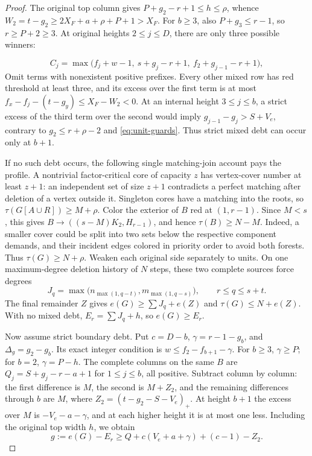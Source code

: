 \documentclass[11pt,a4paper]{article}
\theoremstyle{definition}
\begin{document}
\begin{proof}
The original top column gives $P+g_2-r+1\le h\le\rho$, whence
$W_2=t-g_2\ge2X_F+a+\rho+P+1>X_F$.
For $b\ge3$, also $P+g_3\le r-1$, so $r\ge P+2\ge3$.
At original heights $2\le j\le D$, there are only three possible winners:

\begin{equation}\label{eq:owncap-columns}
 C_j=\max\bigl(f_j+w-1,\ s+g_j-r+1,\ f_2+g_{j-1}-r+1\bigr),
\end{equation}
Omit terms with nonexistent positive prefixes. Every other mixed row has red threshold at least three, and its excess over the first term is at most
$f_x-f_j-(t-g_y)\le X_F-W_2<0$.
At an internal height $3\le j\le b$, a strict excess of the third term over the second would imply
$g_{j-1}-g_j>S+V_e$, contrary to $g_2\le r+\rho-2$ and \eqref{eq:unit-guards}.
Thus strict mixed debt can occur only at $b+1$.

If no such debt occurs, the following single matching-join account pays the profile.
A nontrivial factor-critical core of capacity $z$ has vertex-cover number at least $z+1$: an independent set of size $z+1$ contradicts a perfect matching after deletion of a vertex outside it.
Singleton cores have a matching into the roots, so $\tau(G[A\cup R])\ge M+\rho$.
Color the exterior of $B$ red at $(1,r-1)$. Since $M<s$, this gives
$B\to((s-M)K_2,H_{r-1})$, and hence $\tau(B)\ge N-M$.
Indeed, a smaller cover could be split into two sets below the respective component demands, and their incident edges colored in priority order to avoid both forests.
Thus $\tau(G)\ge N+\rho$.
Weaken each original side separately to units. On one maximum-degree deletion history of $N$ steps, these two complete sources force degrees
\[
 J_q=\max\bigl(n_{\max(1,q-t)},m_{\max(1,q-s)}\bigr),
 \qquad r\le q\le s+t.
\]
The final remainder $Z$ gives $e(G)\ge\sum J_q+e(Z)$ and $\tau(G)\le N+e(Z)$.
With no mixed debt, $E_r=\sum J_q+h$, so $e(G)\ge E_r$.

Now assume strict boundary debt. Put
$c=D-b$, $\gamma=r-1-g_b$, and $\Delta_g=g_2-g_b$.
Its exact integer condition is $w\le f_2-f_{b+1}-\gamma$.
For $b\ge3$, $\gamma\ge P$; for $b=2$, $\gamma=P-h$.
The complete columns on the same $B$ are $Q_j=S+g_j-r-a+1$ for $1\le j\le b$, all positive.
Subtract column by column: the first difference is $M$, the second is $M+Z_2$, and the remaining differences through $b$ are $M$, where
$Z_2=(t-g_2-S-V_e)_+$.
At height $b+1$ the excess over $M$ is $-V_e-a-\gamma$, and at each higher height it is at most one less.
Including the original top width $h$, we obtain
\begin{equation}\label{eq:unit-payment}
 g:=e(G)-E_r\ge Q+c(V_e+a+\gamma)+(c-1)-Z_2.
\end{equation}

\end{proof}
\end{document}
